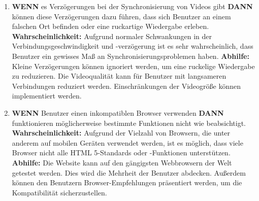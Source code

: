 \begin{enumerate}
    \item
    \textbf{WENN} es Verzögerungen bei der Synchronisierung von Videos gibt \textbf{DANN} können diese Verzögerungen dazu führen, dass sich Benutzer an einem falschen Ort befinden oder eine ruckartige Wiedergabe erleben.
    \linebreak
    \linebreak
    \textbf{Wahrscheinlichkeit:} Aufgrund normaler Schwankungen in der Verbindungsgeschwindigkeit und -verzögerung ist es sehr wahrscheinlich, dass Benutzer ein gewisses Maß an Synchronisierungsproblemen haben.
    \linebreak
    \linebreak
    \textbf{Abhilfe:}  Kleine Verzögerungen können ignoriert werden, um eine ruckelige Wiedergabe zu reduzieren. Die Videoqualität kann für Benutzer mit langsameren Verbindungen reduziert werden. Einschränkungen der Videogröße können implementiert werden.
    \linebreak
    
    \item
    \textbf{WENN} Benutzer einen inkompatiblen Browser verwenden \textbf{DANN} funktionieren möglicherweise bestimmte Funktionen nicht wie beabsichtigt.
    \linebreak
    \linebreak
    \textbf{Wahrscheinlichkeit:} Aufgrund der Vielzahl von Browsern, die unter anderem auf mobilen Geräten verwendet werden, ist es möglich, dass viele Browser nicht alle HTML 5-Standards oder -Funktionen unterstützen.
    \linebreak
    \linebreak
    \textbf{Abhilfe:} Die Website kann auf den gängigsten Webbrowsern der Welt getestet werden. Dies wird die Mehrheit der Benutzer abdecken. Außerdem können den Benutzern Browser-Empfehlungen präsentiert werden, um die Kompatibilität sicherzustellen.
    \linebreak


\end{enumerate}


